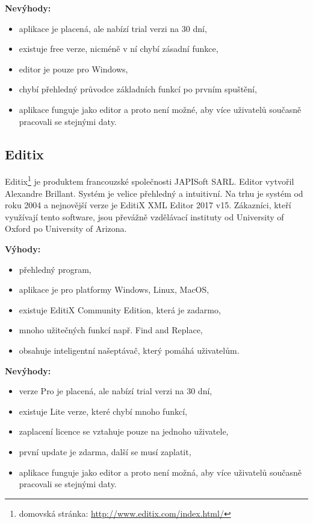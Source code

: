             \textbf{Nevýhody:}
                \begin{itemize}
                    \item aplikace je placená, ale nabízí trial verzi na 30 dní,
                    \item existuje free verze, nicméně v ní chybí zásadní funkce,
                    \item editor je pouze pro Windows,
                    \item chybí přehledný průvodce základních funkcí po prvním spuštění,
                    \item aplikace funguje jako editor a proto není možné, aby více uživatelů současně pracovali se stejnými daty.                \end{itemize}
                
        \subsection{Editix} 
            Editix\footnote{domovská stránka: \url{http://www.editix.com/index.html/}} je produktem francouzské společnosti JAPISoft SARL. Editor vytvořil Alexandre Brillant. Systém je velice přehledný a intuitivní. Na trhu je systém od roku 2004 a nejnovější verze je EditiX XML Editor 2017 v15. Zákazníci, kteří využívají tento software, jsou převážně vzdělávací instituty od University of Oxford po University of Arizona.
            
            \textbf{Výhody:}
                \begin{itemize}
                    \item přehledný program,
                    \item aplikace je pro platformy Windows, Linux, MacOS,
                    \item existuje EditiX Community Edition, která je zadarmo,
                    \item mnoho užitečných funkcí např. Find and Replace,
                    \item obsahuje inteligentní našeptávač, který pomáhá uživatelům.
                \end{itemize}
                
            \textbf{Nevýhody:}
                \begin{itemize}
                    \item verze Pro je placená, ale nabízí trial verzi na 30 dní,
                    \item existuje Lite verze, které chybí mnoho funkcí,
                    \item zaplacení licence se vztahuje pouze na jednoho uživatele,
                    \item první update je zdarma, další se musí zaplatit,
                    \item aplikace funguje jako editor a proto není možná, aby více uživatelů současně pracovali se stejnými daty.   
                \end{itemize}
                

